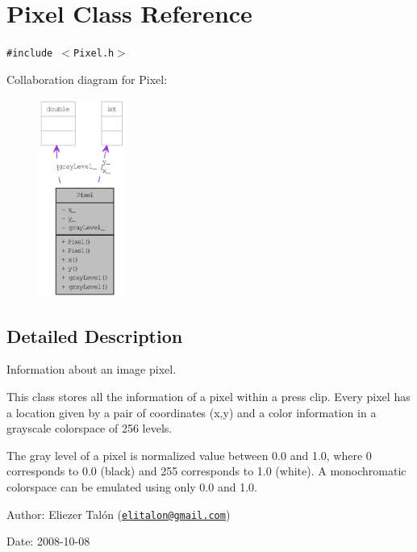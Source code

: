\hypertarget{class_pixel}{
\section{Pixel Class Reference}
\label{class_pixel}
}
{\tt \#include $<$Pixel.h$>$}

Collaboration diagram for Pixel:\nopagebreak
\begin{figure}[H]
\begin{center}
\leavevmode
\includegraphics[width=80pt]{class_pixel__coll__graph}
\end{center}
\end{figure}


\subsection{Detailed Description}
Information about an image pixel. 

This class stores all the information of a pixel within a press clip. Every pixel has a location given by a pair of coordinates (x,y) and a color information in a grayscale colorspace of 256 levels.

The gray level of a pixel is normalized value between 0.0 and 1.0, where 0 corresponds to 0.0 (black) and 255 corresponds to 1.0 (white). A monochromatic colorspace can be emulated using only 0.0 and 1.0.

\begin{Desc}
\item[Author:]Eliezer Talón (\href{mailto:elitalon@gmail.com}{\tt elitalon@gmail.com}) \end{Desc}
\begin{Desc}
\item[Date:]2008-10-08 \end{Desc}


